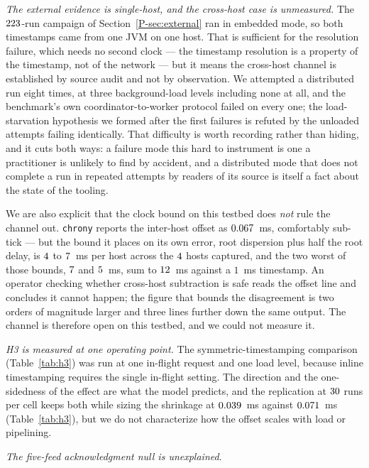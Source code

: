 \documentclass[10pt,journal,onecolumn]{IEEEtran}
\newcommand{\mainModeB}{\ref{P-sec:external}}              %
\begin{document}
\emph{The external evidence is single-host, and the cross-host case is unmeasured.} The
$223$-run campaign of Section~\mainModeB{} ran in embedded mode, so both timestamps came from one
JVM on one host. That is sufficient for the resolution failure, which needs no second clock --- the
timestamp resolution is a property of the timestamp, not of the network --- but it means the cross-host channel
is established by source audit and not by observation. We attempted a distributed run eight times,
at three background-load levels including none at all, and the benchmark's own
coordinator-to-worker protocol failed on every one; the load-starvation hypothesis we formed after
the first failures is refuted by the unloaded attempts failing identically. That difficulty is
worth recording rather than hiding, and it cuts both ways: a failure mode this hard to instrument
is one a practitioner is unlikely to find by accident, and a distributed mode that does not
complete a run in repeated attempts by readers of its source is itself a fact about the state of the
tooling.

We are also explicit that the clock bound on this testbed does \emph{not} rule the channel out.
\texttt{chrony} reports the inter-host offset as $0.067$~ms, comfortably sub-tick ---
but the bound it places on its own error, root dispersion plus half the root delay, is
$4$ to $7$~ms per host across the $4$ hosts captured,
and the two worst of those bounds, $7$ and $5$~ms, sum to
$12$~ms against a $1$~ms timestamp. An operator checking
whether cross-host subtraction is safe reads the offset line and concludes it cannot happen; the
figure that bounds the disagreement is two orders of magnitude larger and three lines further down
the same output. The channel is therefore open on this testbed, and we could not measure it.

\emph{H3 is measured at one operating point.} The symmetric-timestamping comparison (Table~\ref{tab:h3}) was run at one in-flight request and one load level, because inline
timestamping requires the single in-flight setting. The direction and the one-sidedness of the effect
are what the model predicts, and the replication at $30$ runs per cell keeps both
while sizing the shrinkage at $0.039$~ms against $0.071$~ms (Table~\ref{tab:h3}),
but we do not characterize how the offset scales with load or pipelining.

\emph{The five-feed acknowledgment null is unexplained}.
\end{document}
